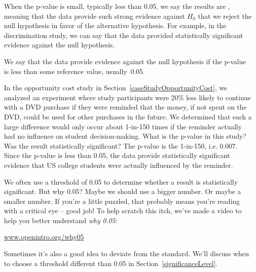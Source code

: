 When the p-value is small, typically less than 0.05, we say the results are , meaning that the data provide such strong evidence against $H_0$ that we reject the null hypothesis in favor of the alternative hypothesis. For example, in the discrimination study, we can say that the data provided statistically significant evidence against the null hypothesis.

\begin{termBox}{
We say that the data provide  evidence against the null hypothesis if the p-value is less than some reference value, usually~0.05.}
\end{termBox}

\begin{example}{In the opportunity cost study in Section~\ref{caseStudyOpportunityCost}, we analyzed an experiment where study participants were 20\% less likely to continue with a DVD purchase if they were reminded that the money, if not spent on the DVD, could be used for other purchases in the future. We determined that such a large difference would only occur about 1-in-150 times if the reminder actually had no influence on student decision-making. What is the p-value in this study? Was the result statistically significant?}
The p-value is the 1-in-150, i.e. 0.007. Since the p-value is less than 0.05, the data provide statistically significant evidence that US college students were actually influenced by the reminder.
\end{example}

\begin{termBox}{
We often use a threshold of 0.05 to determine whether a result is statistically significant. But why 0.05? Maybe we should use a bigger number. Or maybe a smaller number. If you're a little puzzled, that probably means you're reading with a critical eye -- good job! To help scratch this itch, we've made a video to help you better understand \emph{why 0.05}:
\begin{center}
\href{http://www.openintro.org/why05}{www.openintro.org/why05}
\end{center}
Sometimes it's also a good idea to deviate from the standard. We'll discuss when to choose a threshold different than 0.05 in Section~\ref{significanceLevel}.\vspace{0.5mm}}
\end{termBox}

